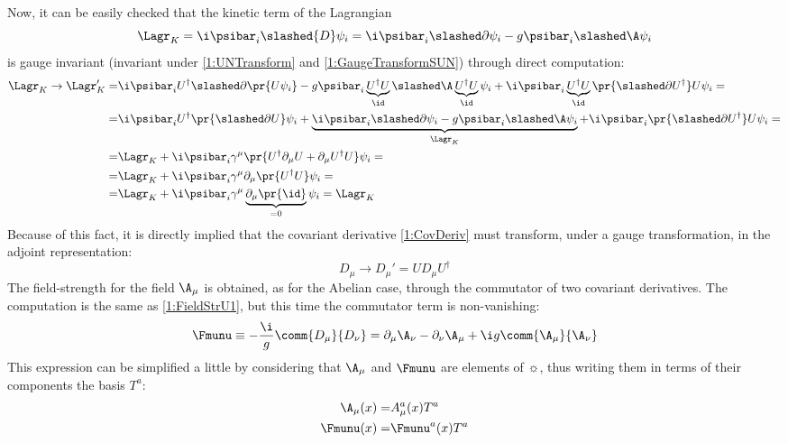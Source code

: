 Now, it can be easily checked that the kinetic term of the Lagrangian
\begin{equation*}
    \Lagr_K = \i\psibar_i\slashed{D}\psi_i = \i\psibar_i\slashed\partial\psi_i -g\psibar_i\slashed\A\psi_i
\end{equation*}
is gauge invariant (\ie invariant under \eqref{1:UNTransform} and \eqref{1:GaugeTransformSUN}) through direct computation:
\begin{align*}
    \Lagr_K \rightarrow \Lagr_K' =& \i\psibar_i U^\dagger\slashed\partial\pr{U\psi_i} -g\psibar_i\underbrace{U^\dagger U}_{\id}\slashed\A\underbrace{U^\dagger U}_{\id}\psi_i +\i\psibar_i\underbrace{U^\dagger U}_{\id}\pr{\slashed\partial U^\dagger}U\psi_i= \\
    =& \i\psibar_i U^\dagger\pr{\slashed\partial U}\psi_i +\underbrace{\i\psibar_i\slashed\partial\psi_i -g\psibar_i\slashed\A\psi_i}_{\Lagr_K} +\i\psibar_i\pr{\slashed\partial U^\dagger}U\psi_i= \\
    =& \Lagr_K +\i\psibar_i\gamma^\mu\pr{U^\dagger\partial_\mu U+ \partial_\mu U^\dagger U}\psi_i= \\
    =& \Lagr_K +\i\psibar_i\gamma^\mu\partial_\mu\pr{U^\dagger U}\psi_i= \\
    =& \Lagr_K +\i\psibar_i\gamma^\mu\underbrace{\partial_\mu\pr{\id}}_{=0}\psi_i = \Lagr_K
\end{align*}
Because of this fact, it is directly implied that the covariant derivative \eqref{1:CovDeriv} must transform, under a gauge transformation, in the adjoint representation:
\begin{equation}
    D_\mu \rightarrow D_\mu' = U D_\mu U^\dagger \label{1:GaugeTrCovDer}
\end{equation}
The field-strength for the field $\A_\mu$ is obtained, as for the Abelian case, through the commutator of two covariant derivatives. The computation is the same as \eqref{1:FieldStrU1}, but this time the commutator term is non-vanishing:
\begin{equation}
    \Fmunu\equiv -\frac{\i}{g}\comm{D_\mu}{D_\nu} = \partial_\mu\A_\nu -\partial_\nu\A_\mu +\i g\comm{\A_\mu}{\A_\nu} \label{1:FieldStrDef}
\end{equation}
This expression can be simplified a little by considering that $\A_\mu$ and $\Fmunu$ are elements of $\sun$, thus writing them in terms of their components \wrt the basis $T^a$:
\begin{align}
    \A_\mu(x) =& A_\mu^a(x) T^a \label{1:AmuComp}\\
    \Fmunu(x) =& \Fmunu^a(x) T^a \label{1:FmunuComp}
\end{align}
